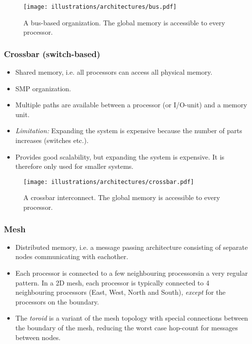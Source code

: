 \begin{figure}[htbp]
  \centering
  \texttt{[image: illustrations/architectures/bus.pdf]}
  \caption{A bus-based organization. The global memory is accessible to every processor.}
  \label{fig:bus}
\end{figure}



\subsubsection{Crossbar (switch-based)} %

\begin{itemize}
\label{ssub:crossbar}

  \item Shared memory, i.e. all processors can access all physical memory.
  \item SMP organization.
  \item Multiple paths are available between a processor (or I/O-unit) and a memory unit.
  \item \emph{Limitation:} Expanding the system is expensive because the number of parts increases (switches etc.).
  \item Provides good scalability, but expanding the system is expensive. It is therefore only used for smaller systems.
\end{itemize}

\begin{figure}[htbp]
  \centering
  \texttt{[image: illustrations/architectures/crossbar.pdf]}
  \caption{A crossbar interconnect. The global memory is accessible to every processor.}
  \label{fig:crossbar}
\end{figure}


\subsubsection{Mesh} %
\label{ssub:mesh}

\begin{itemize}
  \item Distributed memory, i.e. a message passing architecture consisting of separate nodes communicating with eachother.
  \item Each processor is connected to a few neighbouring processorsin a very regular pattern. In a 2D mesh, each processor is typically connected to 4 neighbouring processors (East, West, North and South), \emph{except} for the processors on the boundary.
  \item The \emph{toroid} is a variant of the mesh topology with special connections between the boundary of the mesh, reducing the worst case hop-count for messages between nodes.
\end{itemize}

